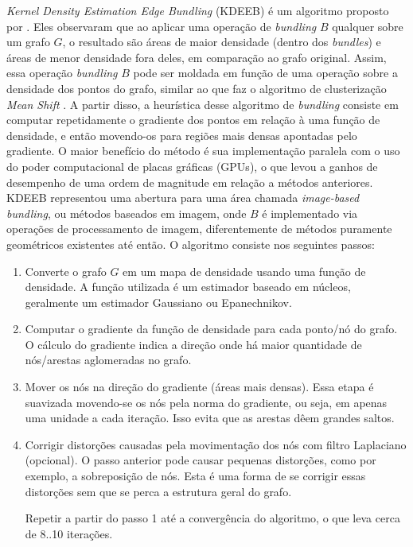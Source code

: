 \emph{Kernel Density Estimation Edge Bundling} (KDEEB) é um algoritmo proposto
por \citet{Hurter2012}. Eles observaram que ao aplicar uma operação de \emph{bundling} $B$ qualquer sobre um
grafo $G$, o resultado são áreas de maior densidade (dentro dos \emph{bundles})
e áreas de menor densidade fora deles, em comparação ao grafo original. Assim,
essa operação \emph{bundling} $B$ pode ser moldada em função de uma operação
sobre a densidade dos pontos do grafo, similar ao que faz o algoritmo de
clusterização \emph{Mean Shift} \citep{Comaniciu2012}. A partir disso, a heurística
desse algoritmo de \emph{bundling} consiste em computar repetidamente o
gradiente dos pontos em relação à uma função de densidade, e então movendo-os
para regiões mais densas apontadas pelo gradiente. O maior benefício do método
é sua implementação paralela com o uso do poder computacional de placas
gráficas (GPUs), o que levou a ganhos de desempenho de uma ordem de magnitude
em relação a métodos anteriores. KDEEB representou uma abertura para uma área
chamada \emph{image-based bundling}, ou métodos baseados em imagem, onde $B$ é
implementado via operações de processamento de imagem, diferentemente de
métodos puramente geométricos existentes até então. O algoritmo consiste nos
seguintes passos:

\begin{enumerate}
  \item Converte o grafo $G$ em um mapa de densidade usando uma função de
densidade. A função utilizada é um estimador baseado em núcleos, geralmente um
estimador Gaussiano ou Epanechnikov.

  \item Computar o gradiente da função de densidade para cada ponto/nó do
grafo. O cálculo do gradiente indica a direção onde há maior quantidade
de nós/arestas aglomeradas no grafo.

  \item Mover os nós na direção do gradiente (áreas mais densas). Essa etapa é
suavizada movendo-se os nós pela norma do gradiente, ou seja, em apenas uma unidade
a cada iteração. Isso evita que as arestas dêem grandes saltos.

  \item Corrigir distorções causadas pela movimentação dos nós com filtro
Laplaciano (opcional).  O passo anterior pode causar pequenas distorções, como
por exemplo, a sobreposição de nós. Esta é uma forma de se corrigir essas
distorções sem que se perca a estrutura geral do grafo.

  Repetir a partir do passo 1 até a convergência do algoritmo, o que leva cerca de 8..10
iterações.
\end{enumerate}

